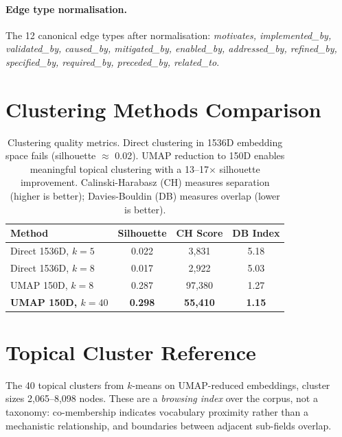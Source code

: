 \documentclass[10pt,twocolumn,letterpaper]{article}
\begin{document}
\paragraph{Edge type normalisation.} The 12 canonical edge types after normalisation:
\textit{motivates, implemented\_by, validated\_by, caused\_by, mitigated\_by, enabled\_by,
addressed\_by, refined\_by, specified\_by, required\_by, preceded\_by, related\_to}.

\section{Clustering Methods Comparison}
\label{app:clustering}

\begin{table}[h]
\centering
\small
\begin{tabular}{lccc}
\toprule
\textbf{Method} & \textbf{Silhouette} & \textbf{CH Score} & \textbf{DB Index} \\
\midrule
Direct 1536D, $k=5$ & 0.022 & 3,831 & 5.18 \\
Direct 1536D, $k=8$ & 0.017 & 2,922 & 5.03 \\
UMAP 150D, $k=8$ & 0.287 & 97,380 & 1.27 \\
\textbf{UMAP 150D, $k=40$} & \textbf{0.298} & \textbf{55,410} & \textbf{1.15} \\
\bottomrule
\end{tabular}
\caption{Clustering quality metrics. Direct clustering in 1536D embedding space fails
(silhouette $\approx$ 0.02). UMAP reduction to 150D enables meaningful topical clustering
with a 13--17$\times$ silhouette improvement. Calinski-Harabasz (CH) measures separation
(higher is better); Davies-Bouldin (DB) measures overlap (lower is better).}
\label{tab:clustering-methods}
\end{table}

\section{Topical Cluster Reference}
\label{app:clusters}

The 40 topical clusters from $k$-means on UMAP-reduced embeddings, cluster sizes
2{,}065--8{,}098 nodes. These are a \emph{browsing index} over the corpus, not a taxonomy:
co-membership indicates vocabulary proximity rather than a mechanistic relationship, and
boundaries between adjacent sub-fields overlap.
\end{document}
